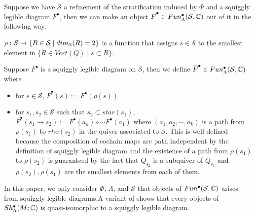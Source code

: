 Suppose we have $\mathcal{S}$ a refinement of the stratification induced by $\Phi$ and a squiggly legible diagram $F^\bullet$, then we can make an object $\overline{F}^\bullet \in Fun^\bullet_\Lambda(\mathcal{S},\mathbb{C})$ out of it in the following way.
\begin{definition}
$\rho : \mathcal{S} \rightarrow \{R\in \mathcal{S} \mid dim_{\mathbb{R}}(R) =2\}$ is a function that assigns $s\in \mathcal{S}$ to the smallest element in $\{R\in Vert(Q) \mid s \subset \overline{R}\}$.
\end{definition}

\begin{definition}
Suppose $F^\bullet$ is a squiggly legible diagram on $\mathcal{S}$, then we define $\overline{F}^\bullet \in Fun^\bullet _\Lambda (\mathcal{S},\mathbb{C})$ where 
\begin{itemize}
\item for $s\in \mathcal{S}$, $\overline{F}^\bullet(s) := F^\bullet(\rho(s))$

\item for $s_1,s_2 \in \mathcal{S}$ such that $s_2 \subset star(s_1)$, $\overline{F}^\bullet (s_1 \rightarrow s_2) := F^\bullet(a_k)\circ \cdots F^\bullet(a_1)$ where $(a_1,a_2,\cdots,a_k)$ is a path from $\rho(s_1)$ to $rho(s_2)$ in the quiver associated to $\mathcal{S}$. This is well-defined because the composition of cochain maps are path independent by the definition of squiggly legible diagram and the existence of a path from $\rho(s_1)$ to $\rho(s_2)$ is guaranteed by the fact that $Q_{s_2}$ is a subquiver of $Q_{s_1}$ and $\rho(s_2),\rho(s_1)$ are the smallest elements from each of them.
\end{itemize}
\end{definition}
In this paper, we only consider $\Phi$, $\Lambda$, and $\mathcal{S}$ that objects of $Fun^\bullet(\mathcal{S},\mathbb{C})$ arises from squiggly legible diagrams.A variant of \cite[Prop~3.22.]{shende2017legendrian} shows that every objects of $Sh^\bullet_\Lambda(M;\mathbb{C})$ is quasi-isomorphic to a squiggly legible diagram.


